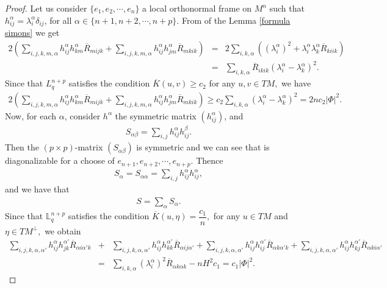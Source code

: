 \documentclass[10pt,a4paper]{amsart}
\begin{document}
\begin{proof}

Let us consider $\{e_1,e_2,\cdots,e_{n}\}$ a local orthonormal frame on $M^{n}$ such that $h_{ij}^{\alpha}=\lambda_i^{\alpha}\delta_{ij}$, for all $\alpha\in \{n+1,n+2,\cdots,n+p\}.$ From of the Lemma \ref{formula simons} we get
\begin{eqnarray*}
2\left(\sum_{i,j,k,m,\alpha}h_{ij}^{\alpha}h_{km}^{\alpha}\overline{R}_{mijk}+\sum_{i,j,k,m,\alpha}h_{ij}^{\alpha}h_{jm}^{\alpha}\overline{R}_{mkik}\right)
&=&2\sum_{i,k,\alpha}\left((\lambda_{i}^{\alpha})^2+\lambda_i^{\alpha}\lambda_k^{\alpha}\overline{R}_{kiik}\right)\\
&=&\sum_{i,k,\alpha}\overline{R}_{ikik}\left(\lambda_i^{\alpha}-\lambda_k^{\alpha}\right)^2.
\end{eqnarray*}
Since that $L_{q}^{n+p}$ satisfies the condition $\overline{K}(u,v)\geq c_2$ for any $u,v\in TM,$ we have
\begin{eqnarray*}
2\left(\sum_{i,j,k,m,\alpha}h_{ij}^{\alpha}h_{km}^{\alpha}\overline{R}_{mijk}+\sum_{i,j,k,m,\alpha}h_{ij}^{\alpha}h_{jm}^{\alpha}\overline{R}_{mkik}\right)\geq c_2\sum_{i,k,\alpha}(\lambda_i^{\alpha}-\lambda_k^{\alpha})^2=2nc_2|\Phi|^2.
\end{eqnarray*}
Now, for each $\alpha$, consider $h^{\alpha}$ the symmetric matrix $(h_{ij}^{\alpha})$, and 
\begin{eqnarray*}
S_{\alpha\beta}=\sum_{i,j}h_{ij}^{\alpha}h_{ij}^{\beta}.
\end{eqnarray*}
Then the $(p\times p)$-matrix $(S_{\alpha\beta})$ is symmetric and we can see that is diagonalizable for a choose of $e_{n+1},e_{n+2},\cdots,e_{n+p}.$ Thence 
\begin{eqnarray*}
S_{\alpha}=S_{\alpha\alpha}=\sum_{i,j}h_{ij}^{\alpha}h_{ij}^{\alpha},
\end{eqnarray*}
and we have that 
\begin{eqnarray*}
S=\sum_{\alpha}S_{\alpha}.
\end{eqnarray*}
Since that $\mathbb{L}_{q}^{n+p}$ satisfies the condition $\overline{K}(u,\eta)=\dfrac{c_1}{n},$ for any $u\in TM$ and $\eta\in TM^{\perp},$ we obtain
\begin{eqnarray*}
\sum_{i,j,k,\alpha,\alpha'}h_{ij}^{\alpha}h_{jk}^{\alpha'}\overline{R}_{\alpha i\alpha' k}&+&\sum_{i,j,k,\alpha,\alpha'}h_{ij}^{\alpha}h_{kk}^{\alpha'}\overline{R}_{\alpha ij \alpha'}+\sum_{i,j,k,\alpha,\alpha'}h_{ij}^{\alpha}h_{ij}^{\alpha'}\overline{R}_{\alpha k\alpha'k}+\sum_{i,j,k,\alpha,\alpha'}h_{ij}^{\alpha}h_{kj}^{\alpha'}\overline{R}_{\alpha ki \alpha'}\\
&=&\sum_{i,k,\alpha}(\lambda_i^{\alpha})^2\overline{R}_{\alpha k\alpha k}-nH^2c_1
=c_1|\Phi|^2.
\end{eqnarray*}





\end{proof}
\end{document}
